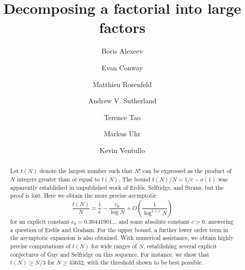 \documentclass[12pt,a4paper,reqno]{amsart}
\numberwithin{equation}{section}
\theoremstyle{plain}
\theoremstyle{definition}
\begin{document}
\title{Decomposing a factorial into large factors}

\author[Alexeev]{Boris Alexeev}
\address{Unaffiliated, Athens, GA 30605.}

\author[Conway]{Evan Conway}
\address{UVA Department of Mathematics, Charlottesville, VA 22903.}

\author[Rosenfeld]{Matthieu Rosenfeld}
\address{LIRMM, Univ Montpellier, CNRS, Montpellier, France.}

\author[Sutherland]{Andrew V. Sutherland}
\address{MIT Department of Mathematics, Cambridge, MA 02139.}

\author[Tao]{Terence Tao}
\address{UCLA Department of Mathematics, Los Angeles, CA 90095-1555.}

\author[Uhr]{Markus Uhr}
\address{Unaffiliated, Zurich, Switzerland.}

\author[Ventullo]{Kevin Ventullo}
\address{Google, Mountain View, CA.}



\begin{abstract}  Let $t(N)$ denote the largest number such that $N!$ can be expressed as the product of $N$ integers greater than or equal to $t(N)$.
The bound $t(N)/N = 1/e-o(1)$ was apparently established in unpublished work of Erd\H{o}s, Selfridge, and Straus; but the proof is lost.  Here we obtain the more precise asymptotic 
$$ \frac{t(N)}{N} = \frac{1}{e} - \frac{c_0}{\log N} + O\left( \frac{1}{\log^{1+c} N} \right)$$
for an explicit constant $c_0 = 0.30441901\dots$ and some absolute constant $c>0$, answering a question of Erd\H{o}s and Graham.  For the upper bound, a further lower order term in the asymptotic expansion is also obtained.  With numerical assistance, we obtain highly precise computations of $t(N)$ for wide ranges of $N$, establishing several explicit conjectures of Guy and Selfridge on this sequence.  For instance, we show that $t(N) \geq N/3$ for $N \geq 43632$, with the threshold shown to be best possible. 
\end{abstract}


\maketitle

\end{document}
